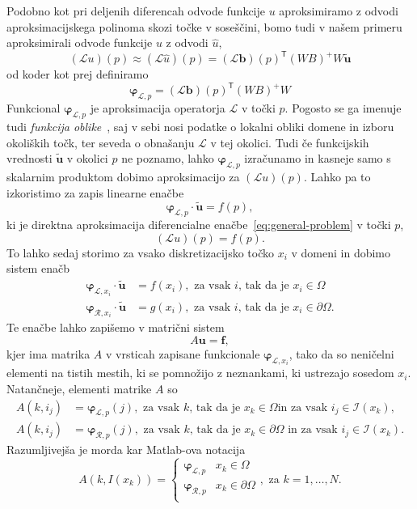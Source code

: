 \documentclass[12pt,a4paper]{article}
\theoremstyle{definition} %
\theoremstyle{plain} %
\newcommand{\Rc}{\mathcal{R}}
\newcommand{\I}{\mathcal{I}}
\renewcommand{\L}{\mathcal{L}}
\newcommand{\T}{\mathsf{T}}
\renewcommand{\b}{\boldsymbol}
\renewcommand{\phi}{\varphi}
\newcommand{\uh}{\hat{u}}
\newcommand{\ang}[1]{\text{(\textit{angl.} #1)}}
\begin{document}
Podobno kot pri deljenih diferencah odvode funkcije $u$ aproksimiramo z odvodi
aproksimacijskega polinoma skozi točke v soseščini, bomo tudi v našem primeru
aproksimirali odvode funkcije $u$ z odvodi $\uh$,
\[
  (\L u)(p) \approx (\L \uh)(p) = (\L\b{b})(p)^\T(WB)^{+}W \b{\tilde{u}}
\]
od koder kot prej definiramo
\begin{equation}
  \b\phi_{\L,p} = (\L\b{b})(p)^\T(WB)^{+}W
  \label{eq:shape-definition}
\end{equation}
Funkcional $\b\phi_{\L,p}$ je aproksimacija operatorja $\L$ v točki $p$.
Pogosto se ga imenuje tudi \emph{funkcija oblike}~\ang{shape function}, saj v
sebi nosi podatke o lokalni obliki domene in izboru okoliških točk, ter seveda o
obnašanju $\L$ v tej okolici. Tudi če funkcijskih vrednosti $\b{\tilde{u}}$ v
okolici $p$ ne poznamo, lahko $\b\phi_{\L, p}$ izračunamo in kasneje samo s
skalarnim produktom dobimo aproksimacijo za $(\L u)(p)$. Lahko pa to izkoristimo
za zapis linearne enačbe
\[
  \b\phi_{\L,p} \cdot \b{\tilde{u}} = f(p),
\]
ki je direktna aproksimacija diferencialne enačbe~\eqref{eq:general-problem} v točki
$p$,
\[
  (\L u)(p) = f(p).
\]
To lahko sedaj storimo za vsako diskretizacijsko točko $x_i$ v domeni in
dobimo sistem enačb
\begin{align*}
  \b\phi_{\L,x_i} \cdot \b{\tilde{u}} &= f(x_i), \text{ za vsak $i$, tak da je $x_i \in \Omega$ } \\
  \b\phi_{\Rc,x_i} \cdot \b{\tilde{u}} &= g(x_i), \text{ za vsak $i$, tak da je $x_i \in \partial\Omega$.}
\end{align*}
Te enačbe lahko zapišemo v matrični sistem
\begin{equation}
  A\b{u} = \b{f},
  \label{eq:discretized-system}
\end{equation}
kjer ima matrika $A$ v vrsticah zapisane funkcionale $\b\phi_{\L,x_i}$, tako da so
neničelni elementi na tistih mestih, ki se pomnožijo z neznankami, ki ustrezajo
sosedom $x_i$. Natančneje, elementi matrike $A$ so
\begin{align*}
  A(k, i_j) &= \b\phi_{\L,p}(j), \text{ za vsak $k$, tak da je $x_k \in \Omega$
  in za vsak $i_j \in \I(x_k)$,} \\
  A(k, i_j) &= \b\phi_{\Rc,p}(j), \text{ za vsak $k$, tak da je $x_k \in
  \partial\Omega$ in za vsak $i_j \in \I(x_k)$.}
\end{align*}
Razumljivejša je morda kar Matlab-ova notacija
\[
A(k, I(x_k)) = \begin{cases}
    \b\phi_{\L, p} & x_k \in \Omega \\
    \b\phi_{\Rc, p} & x_k \in \partial\Omega \\
  \end{cases}, \text{ za $k = 1, \ldots, N$}.
\]
\end{document}
